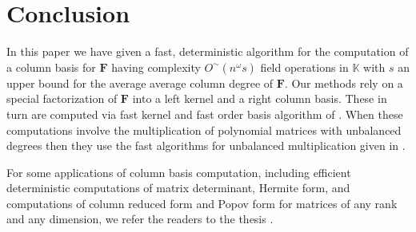
\section{Conclusion}

In this paper we have given a fast, deterministic algorithm for the
computation of a column basis for $\mathbf{F}$ having complexity
$O^{\sim}\left(n^{\omega}s\right)$ field operations in $\mathbb{K}$
with $s$ an upper bound for the average average column degree of
$\mathbf{F}$. Our methods rely on a special factorization of $\mathbf{F}$
into a left kernel and a right column basis. These in turn are computed
via fast kernel and fast order basis algorithm of \cite{za2012,ZL2012}.
When these computations involve the multiplication of polynomial matrices
with unbalanced degrees then they use the fast algorithms for unbalanced
multiplication given in \cite{za2012}.

For some applications of column basis computation, including efficient
deterministic computations of matrix determinant, Hermite form, and
computations of column reduced form and Popov form for matrices of
any rank and any dimension, we refer the readers to the thesis \cite{zhou:phd2012}.


